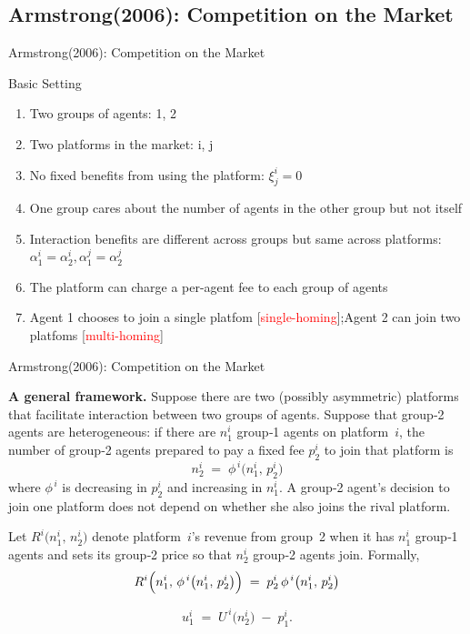 \documentclass[aspectratio=169]{beamer}  %
\begin{document}
\subsection{Armstrong(2006): Competition on the Market}
\begin{frame}{Armstrong(2006): Competition on the Market}
    \begin{block}{Basic Setting}
        \begin{enumerate}
            \item Two groups of agents: 1, 2
            \item Two platforms in the market: i, j
            \item No fixed benefits from using the platform: $\xi_{j}^{i} = 0$
            \item One group cares about the number of agents in the other group but not itself
            \item Interaction benefits are different across groups but same across platforms: $\alpha_{1}^{i} = \alpha_{2}^{i}, \alpha_{1}^{j} = \alpha_{2}^{j}$
            \item The platform can charge a per-agent fee to each group of agents
            \item Agent 1 chooses to join a single platfom [\textcolor{red}{single-homing}];Agent 2 can join two platfoms [\textcolor{red}{multi-homing}]
        \end{enumerate}
    \end{block}
\end{frame}

\begin{frame}{Armstrong(2006): Competition on the Market}
    \justifying  %

    \textbf{A general framework.} Suppose there are two (possibly asymmetric) platforms 
    that facilitate interaction between two groups of agents.  Suppose that group‐2 
    agents are heterogeneous: if there are \(n_{1}^{i}\) group‐1 agents on platform~\(i\), 
    the number of group‐2 agents prepared to pay a fixed fee \(p_{2}^{i}\) to join that 
    platform is
    \[
       n_{2}^{i} 
       \;=\; 
       \phi^{\,i}\bigl(n_{1}^{i},\,p_{2}^{i}\bigr)
    \]
    where \(\phi^{\,i}\) is decreasing in \(p_{2}^{i}\) and increasing in \(n_{1}^{i}\). 
    A group‐2 agent’s decision to join one platform does not depend on whether she also 
    joins the rival platform.
    
    \medskip
    
    Let \(R^{i}\bigl(n_{1}^{i},\,n_{2}^{i}\bigr)\) denote platform~\(i\)’s revenue from 
    group~2 when it has \(n_{1}^{i}\) group‐1 agents and sets its group‐2 price so that 
    \(n_{2}^{i}\) group‐2 agents join. Formally,
    \[
       R^{i}\Bigl(n_{1}^{i},\,\phi^{\,i}\bigl(n_{1}^{i},\,p_{2}^{i}\bigr)\Bigr)
       \;=\;
       p_{2}^{i}\,\phi^{\,i}\bigl(n_{1}^{i},\,p_{2}^{i}\bigr)
    \]
    
    \[
       u_{1}^{i}
       \;=\;
       U^{\,i}\bigl(n_{2}^{i}\bigr)
       \;-\;
       p_{1}^{i}.
    \]
\end{frame}
\end{document}
